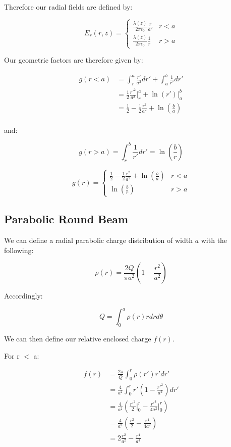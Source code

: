 Therefore our radial fields are defined by:

\[E_r(r,z) = \begin{cases}
        \frac{\lambda(z)}{2\pi\epsilon_0}\frac{r}{a^2} & r < a \\
        \frac{\lambda(z)}{2\pi\epsilon_0}\frac{1}{r}   & r > a
    \end{cases}\]

Our geometric factors are therefore given by:

$$\begin{aligned}
        g(r<a) & = \int_r^a \frac{r'}{a^2}dr'+\int_a^b\frac{1}{r'}dr'                      \\
               & = \frac{1}{2}\frac{r'^2}{a^2}\Big|_r^a + \ln(r')\Big|^b_a                 \\
               & =  \frac{1}{2} - \frac{1}{2}\frac{r^2}{a^2} + \ln\left(\frac{b}{a}\right) \\
    \end{aligned}$$

and\cite{zotter_impedances_1998}:

$$g(r>a) = \int_r^b\frac{1}{r'}dr' = \ln\left(\frac{b}{r}\right)$$

\begin{equation}
    g(r) = \begin{cases}
        \frac{1}{2}-\frac{1}{2}\frac{r^2}{a^2}+\ln(\frac{b}{a}) & r < a \\
        \ln(\frac{b}{r})                                        & r > a
    \end{cases}
    \label{eq:g_uniform}
\end{equation}

\subsection{Parabolic Round Beam}

We can define a radial parabolic charge distribution of width $a$ with the following:

$$\rho(r) = \frac{2Q}{\pi a^2}\left(1-\frac{r^2}{a^2}\right)$$

Accordingly:

$$Q = \int_0^a \rho(r) r dr d\theta$$

We can then define our relative enclosed charge $f(r)$.

For r $<$ a:

$$\begin{aligned}
        f(r) & = \frac{2\pi}{Q}\int_0^r\rho(r')r'dr'                                           \\
             & = \frac{4}{a^2}\int_0^rr'(1-\frac{r'^2}{a^2})dr'                                \\
             & = \frac{4}{a^2}\left(\frac{r'^2}{2}\Big|_0^r -\frac{r'^4}{4a^2}\Big|_0^r\right) \\
             & = \frac{4}{a^2}\left(\frac{r^2}{2}-\frac{r^4}{4a^2}\right)                      \\
             & = 2\frac{r^2}{a^2}-\frac{r^4}{a^4}
    \end{aligned}$$


